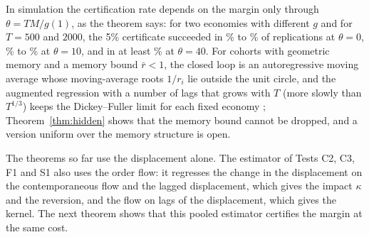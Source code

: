 In simulation the certification rate depends on the margin only through $\theta=TM/g(1)$, as the theorem says: for two economies with different $g$ and for $T=500$ and $2000$, the 5\% certificate succeeded in \UniformPowerZero\% to \UniformPowerZeroHi\% of replications at $\theta=0$, \UniformPowerTenLo\% to \UniformPowerTenHi\% at $\theta=10$, and in at least \UniformPowerForty\% at $\theta=40$. For cohorts with geometric memory and a memory bound $\bar r<1$, the closed loop is an autoregressive moving average whose moving-average roots $1/r_i$ lie outside the unit circle, and the augmented regression with a number of lags that grows with $T$ (more slowly than $T^{1/3}$) keeps the Dickey--Fuller limit for each fixed economy \citep{t:saiddickey1984}; Theorem~\ref{thm:hidden} shows that the memory bound cannot be dropped, and a version uniform over the memory structure is open.

The theorems so far use the displacement alone. The estimator of Tests C2, C3, F1 and S1 also uses the order flow: it regresses the change in the displacement on the contemporaneous flow and the lagged displacement, which gives the impact $\kappa$ and the reversion, and the flow on lags of the displacement, which gives the kernel. The next theorem shows that this pooled estimator certifies the margin at the same cost.

